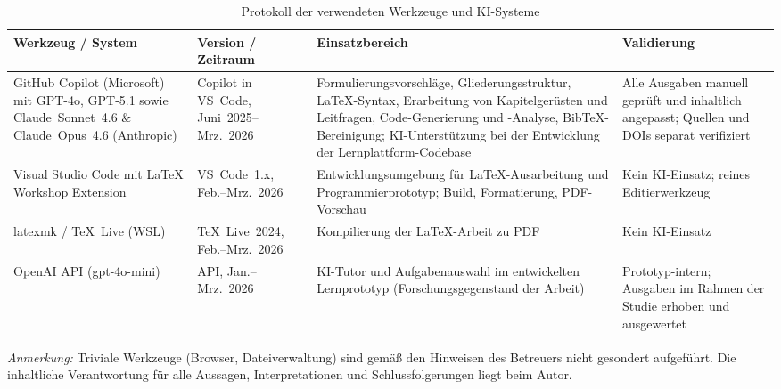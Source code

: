 \renewcommand{\arraystretch}{1.4}
\begin{table}[htbp]
\centering
\caption{Protokoll der verwendeten Werkzeuge und KI-Systeme}
\label{tab:werkzeugprotokoll}
\begingroup
	\setlength{\tabcolsep}{6pt}%
	\small
	\begin{tabular}{|P{3.2cm}|P{2.6cm}|P{4.6cm}|P{3.8cm}|}
	\hline
	\textbf{Werkzeug / System} & \textbf{Version / Zeitraum} & \textbf{Einsatzbereich} & \textbf{Validierung} \\
	\hline
	GitHub Copilot (Microsoft) mit GPT-4o, GPT-5.1 sowie Claude~Sonnet~4.6 \& Claude~Opus~4.6 (Anthropic) &
	Copilot in VS~Code, Juni~2025--Mrz.~2026 &
	Formulierungsvorschläge, Gliederungsstruktur, \LaTeX-Syntax, Erarbeitung von Kapitelgerüsten und Leitfragen, Code-Generierung und -Analyse, BibTeX-Bereinigung; KI-Unterstützung bei der Entwicklung der Lernplattform-Codebase &
	Alle Ausgaben manuell geprüft und inhaltlich angepasst; Quellen und DOIs separat veri\-fiziert \\
	\hline
	Visual Studio Code \cite{vscode} mit LaTeX Workshop Extension &
	VS~Code~1.x, Feb.--Mrz.~2026 &
	Entwicklungsumgebung für \LaTeX-Ausarbeitung und Programmierprototyp; Build, Formatierung, PDF-Vorschau &
	Kein KI-Einsatz; reines Editierwerkzeug \\
	\hline
	latexmk / \TeX~Live (WSL) &
	\TeX~Live~2024, Feb.--Mrz.~2026 &
	Kompilierung der \LaTeX-Arbeit zu PDF &
	Kein KI-Einsatz \\
	\hline
	OpenAI API (gpt-4o-mini) \cite{openai_api} &
	API, Jan.--Mrz.~2026 &
	KI-Tutor und Aufgabenauswahl im entwickelten Lernprototyp (Forschungsgegenstand der Arbeit) &
	Prototyp-intern; Ausgaben im Rahmen der Studie erhoben und ausgewertet \\
	\hline
	\end{tabular}
\endgroup
\end{table}

\noindent
\textit{Anmerkung:} Triviale Werkzeuge (Browser, Datei\-ver\-wal\-tung) sind gemäß den Hinweisen des Betreuers nicht gesondert aufgeführt.
Die inhaltliche Verantwortung für alle Aussagen, Interpretationen und Schlussfolgerungen liegt beim Autor.
